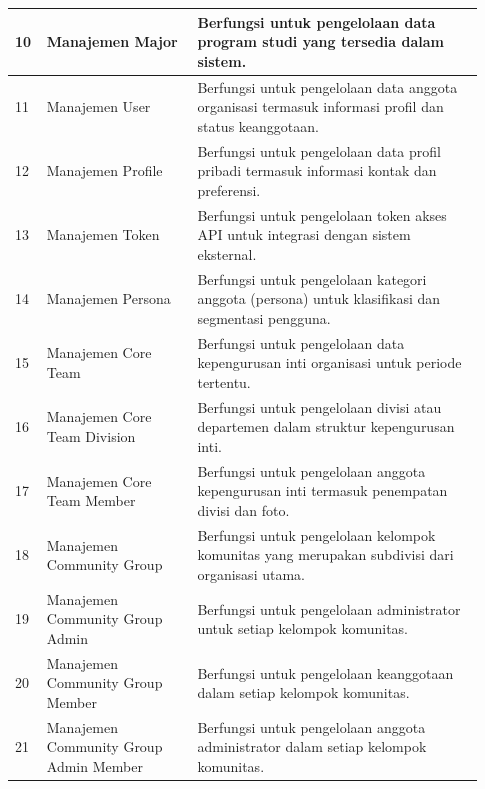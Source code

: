 \begin{longtable}{|p{0.05\linewidth}|p{0.30\linewidth}|p{0.58\linewidth}|}
      \hline
      10          & Manajemen Major                        & Berfungsi untuk pengelolaan data program studi yang tersedia dalam sistem.                            \\
      \hline
      11          & Manajemen User                         & Berfungsi untuk pengelolaan data anggota organisasi termasuk informasi profil dan status keanggotaan. \\
      \hline
      12          & Manajemen Profile                      & Berfungsi untuk pengelolaan data profil pribadi termasuk informasi kontak dan preferensi.             \\
      \hline
      13          & Manajemen Token                        & Berfungsi untuk pengelolaan token akses API untuk integrasi dengan sistem eksternal.                  \\
      \hline
      14          & Manajemen Persona                      & Berfungsi untuk pengelolaan kategori anggota (persona) untuk klasifikasi dan segmentasi pengguna.     \\
      \hline
      15          & Manajemen Core Team                    & Berfungsi untuk pengelolaan data kepengurusan inti organisasi untuk periode tertentu.                 \\
      \hline
      16          & Manajemen Core Team Division           & Berfungsi untuk pengelolaan divisi atau departemen dalam struktur kepengurusan inti.                  \\
      \hline
      17          & Manajemen Core Team Member             & Berfungsi untuk pengelolaan anggota kepengurusan inti termasuk penempatan divisi dan foto.            \\
      \hline
      18          & Manajemen Community Group              & Berfungsi untuk pengelolaan kelompok komunitas yang merupakan subdivisi dari organisasi utama.        \\
      \hline
      19          & Manajemen Community Group Admin        & Berfungsi untuk pengelolaan administrator untuk setiap kelompok komunitas.                            \\
      \hline
      20          & Manajemen Community Group Member       & Berfungsi untuk pengelolaan keanggotaan dalam setiap kelompok komunitas.                              \\
      \hline
      21          & Manajemen Community Group Admin Member & Berfungsi untuk pengelolaan anggota administrator dalam setiap kelompok komunitas.                    \\

\end{longtable}
